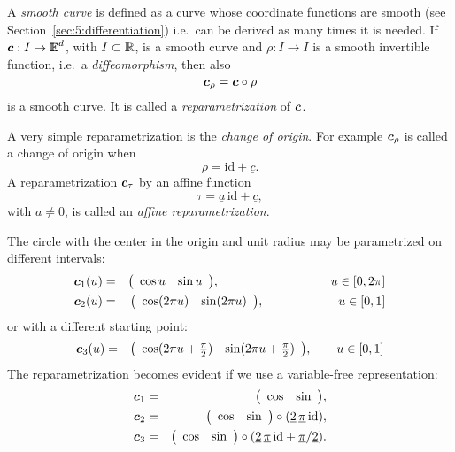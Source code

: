 \documentclass{31x47jw}
\begin{document}
A \emph{smooth curve} is defined as a curve whose coordinate functions
are smooth (see Section~\ref{sec:5:differentiation}) i.e.~can be
derived as many times it is needed.  If ${\mbox{\boldmath $c$}}:I\rightarrow \mathbb{I\!\!E}^{d}$,
with $I\subset\mathbb{I\!\!R}$, is a smooth curve and $\rho:I\rightarrow I$ is a
smooth invertible function, i.e.~a \emph{diffeomorphism}, then also
\[
{\mbox{\boldmath $c$}}_{\rho} = {\mbox{\boldmath $c$}} \circ \rho
\]
is a smooth curve. It is called a \emph{reparametrization} of ${\mbox{\boldmath $c$}}$.

A very simple reparametrization is the \emph{change of origin}.  For
example ${\mbox{\boldmath $c$}}_{\rho}$ is called a {change of origin} when
\[
\rho=\textrm{id}+\underline{c}.
\]
A reparametrization ${\mbox{\boldmath $c$}}_{\tau}$ by an affine
function 
\[
\tau=\underline{a}\,\textrm{id}+\underline{c},
\]
with $a\not= 0$, is called an \emph{affine reparametrization}.

\begin{example}
    
The circle with the center in the origin and unit 
radius may be parametrized on different intervals:
\begin{eqnarray*}
{\mbox{\boldmath $c$}}_{1}(u) &=& {\left(\begin{array}{cccccccc}\cos u & \sin u\end{array}\right)}, 
\qquad\qquad\qquad\qquad~~~ u\in [0,2\pi]
\\
{\mbox{\boldmath $c$}}_{2}(u) &=& {\left(\begin{array}{cccccccc}\cos (2\pi u) & 
\sin (2\pi u)\end{array}\right)}, 
\qquad\qquad\qquad u\in [0,1]
\label{ex:reparametrization}
\end{eqnarray*}
or with a different starting point:
\begin{eqnarray*}
{\mbox{\boldmath $c$}}_{3}(u) &=& {\left(\begin{array}{cccccccc}\cos (2\pi u+\frac{\pi}{2}) & 
\sin (2\pi u+\frac{\pi}{2})\end{array}\right)}, 
\qquad u\in [0,1]
\label{ex:reparametrization2}
\end{eqnarray*}
The reparametrization becomes evident if we use a variable-free 
representation:
\begin{eqnarray*}
{\mbox{\boldmath $c$}}_{1} &=& {\left(\begin{array}{cccccccc}\cos & \sin \end{array}\right)} , 
\\
{\mbox{\boldmath $c$}}_{2} &=& {\left(\begin{array}{cccccccc}\cos & \sin \end{array}\right)} \circ 
(\underline{2}\,\underline{\pi}\, \textrm{id} ), 
\\
{\mbox{\boldmath $c$}}_{3} &=& {\left(\begin{array}{cccccccc}\cos & \sin \end{array}\right)} \circ 
(\underline{2}\,\underline{\pi}\, \textrm{id} + 
{\underline{\pi}}/{\underline{2}
}).
\end{eqnarray*}

\end{example}
\end{document}
